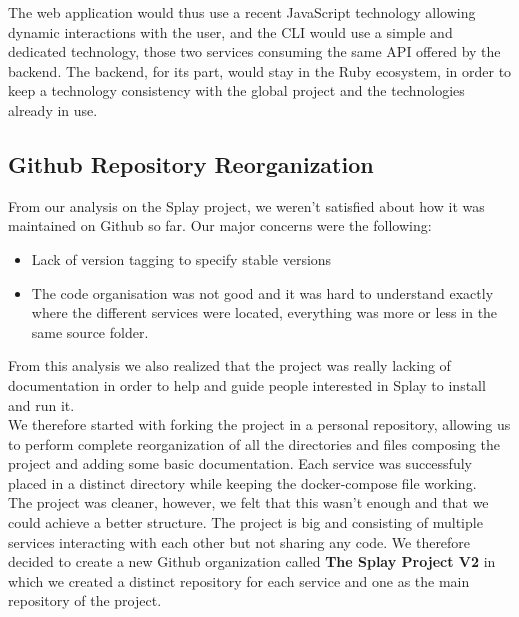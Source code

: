 \documentclass{eplmastersthesis}
\begin{document}
        The web application would thus use a recent JavaScript technology
        allowing dynamic interactions with the user, and the CLI would use
        a simple and dedicated technology, those two services consuming the
        same API offered by the backend. The backend, for its part, would
        stay in the Ruby ecosystem, in order to keep a technology consistency
        with the global project and the technologies already in use.

      \subsection{Github Repository Reorganization}

        From our analysis on the Splay project, we weren't satisfied about how
        it was maintained on Github so far. Our major concerns were the
        following:

        \begin{itemize}
          \item Lack of version tagging to specify stable versions
          \item The code organisation was not good and it was hard to
          understand exactly where the different services were located,
          everything was more or less in the same source folder.
        \end{itemize}

        From this analysis we also realized that the project was really
        lacking of documentation in order to help and guide people interested
        in Splay to install and run it.\\

        We therefore started with forking the project in a personal repository,
        allowing us to perform complete reorganization of all the directories
        and files composing the project and adding some basic documentation.
        Each service was successfuly placed in a distinct directory while
        keeping the docker-compose file working.\\
        The project was cleaner, however, we felt that this wasn't enough
        and that we could achieve a better structure. The project is big and
        consisting of multiple services interacting with each other but
        not sharing any code. We therefore decided to create a new Github
        organization called \textbf{The Splay Project V2} in which we created
        a distinct repository for each service and one as the main repository
        of the project.\\
\end{document}
